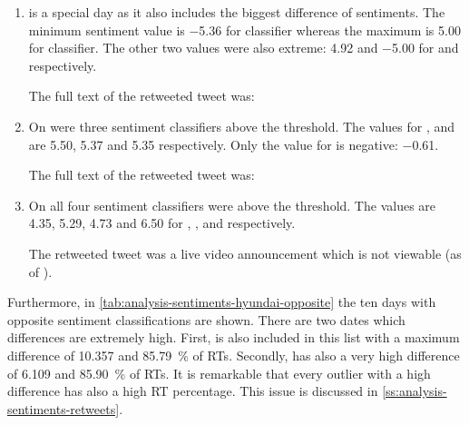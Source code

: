 \begin{enumerate}
    \item 
         is a special day as it also includes the biggest difference of sentiments.
        The minimum sentiment value is \num{-5.36} for \nb{} classifier whereas the maximum is \num{5.00} for \me{} classifier.
        The other two values were also extreme: \num{4.92} and \num{-5.00} for \tb{} and \svm{} respectively.


        The full text of the retweeted tweet was:

    \item
        On  were three sentiment classifiers above the threshold.
        The values for \tb{}, \nb{} and \me{} are \num{5.50}, \num{5.37} and \num{5.35} respectively.
        Only the value for \svm{} is negative: \num{-0.61}.


        The full text of the retweeted tweet was:

    \item
        On  all four sentiment classifiers were above the threshold.
        The values are \num{4.35}, \num{5.29}, \num{4.73} and \num{6.50} for \ftb{}, \fnb{}, \fme{} and \fsvm{} respectively.

        The retweeted tweet was a live video announcement which is not viewable (as of ).
\end{enumerate}

\begin{figure}[hbt]
    \centering
    
    \caption{\sentimentsCaption{\hyundai}}
    \label{fig:analysis-sentiments-hyundai}
\end{figure} 

Furthermore, in \cref{tab:analysis-sentiments-hyundai-opposite} the ten days with opposite sentiment classifications are shown.
There are two dates which differences are extremely high.
First,  is also included in this list with a maximum difference of \num{10.357} and \SI{85.79}{\percent} of \acp{RT}.
Secondly,  has also a very high difference of \num{6.109} and \SI{85.90}{\percent} of \acp{RT}.
It is remarkable that every outlier with a high difference has also a high \ac{RT} percentage.
This issue is discussed in \cref{ss:analysis-sentiments-retweets}.

